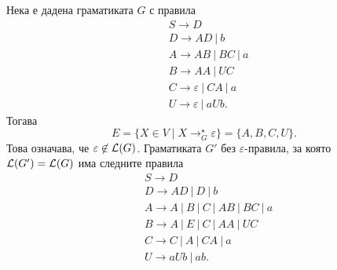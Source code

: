 \begin{example}
  Нека е дадена граматиката $G$ с правила
  \begin{align*}
    & S \to D\\
    & D \to AD\ |\ b\\
    & A \to AB\ |\ BC\ |\ a\\
    & B \to AA\ |\ UC\\
    & C \to \varepsilon\ |\ CA\ |\ a\\
    & U \to \varepsilon\ |\ aUb.
  \end{align*}
  Тогава
  \[E = \{X \in V \mid X \rightarrow^\star_G \varepsilon\} = \{A,B,C,U\}.\]
  Това означава, че $\varepsilon \not\in \mathcal{L}(G)$.
  Граматиката $G'$ без $\varepsilon$-правила, за която $\mathcal{L}(G') = \mathcal{L}(G)$ има следните правила
  \begin{align*}
    & S \to D \\
    & D\to AD\ |\ D\ |\ b \\
    & A \to A\ |\ B\ |\ C\ |\ AB\ |\ BC\ |\ a \\
    & B\to A\ |\ E\ |\ C\ |\ AA\ |\ UC\\
    & C \to C\ |\ A\ |\ CA\ |\ a\\
    & U \to aUb\ |\ ab.
  \end{align*}
\end{example}

